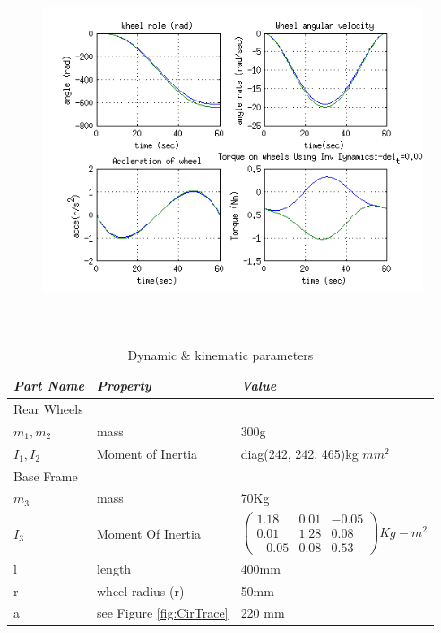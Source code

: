 { \begin{figure}
	\includegraphics[height=300pt,keepaspectratio]{Chapter4/fig/FD}
	\label{fig:spiral} 
\end{figure} 
%
\begin{table}[!htbp]
	\caption{Dynamic \& kinematic parameters }
	\label{tb:massproperty}
	\centering
	\begin{tabular}{l l l}
		\hline
		\emph{Part Name}  & \emph{ Property} & \emph{Value} \\
		\hline
		Rear Wheels & & \\
		 $m_1,m_2$	& mass				&300g \\ 
		  $I_1,I_2$	& Moment of Inertia	& diag(242, 242, 465)kg $mm^2$\\
		Base Frame& & \\
		 $m_3$ & mass  & 70Kg \\
		 $ I_3$& Moment Of Inertia & $ \begin{pmatrix}
		 1.18& 0.01&-0.05\\ 0.01 & 1.28 & 0.08\\
		 -0.05 & 0.08 & 0.53
		 \end{pmatrix} Kg-m^2$ \\
		   l & length & 400mm\\
		  r & wheel radius (r) & 50mm\\
		 a & see Figure \ref{fig:CirTrace} & 220 mm \\ 
		\hline
		\end{tabular}
\end{table}
}
